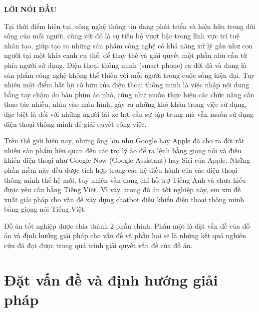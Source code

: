 \documentclass[12pt]{report}
\begin{document}
\newpage

\tableofcontents
\newpage

\listoffigures
{}
\newpage

\listoftables
{}

\newpage
\lstlistoflistings
{}

\newpage
\begin{center}
{\large \textbf{LỜI NÓI ĐẦU}}
\end{center}
Tại thời điểm hiện tại, công nghệ thông tin đang phát triển và hiện hữu trong đời sống của mỗi người, cùng với đó là sự tiến bộ vượt bậc trong lĩnh vực trí tuệ nhân tạo, giúp tạo ra những sản phẩm công nghệ có khả năng xử lý gần như con người tại một khía cạnh cụ thể, để thay thế và giải quyết một phần nhu cầu từ phía người sử dụng. Điện thoại thông minh (smart phone) ra đời đã và đang là sản phẩm công nghệ không thể thiếu với mỗi người trong cuộc sống hiện đại. Tuy nhiên một điểm bất lợi cố hữu của điện thoại thông minh là việc nhập nội dung bằng tay chậm do bàn phím ảo nhỏ, cũng như muốn thực hiện các chức năng cần thao tác nhiều, nhìn vào màn hình, gây ra những khó khăn trong việc sử dụng, đặc biệt là đối với những người lái xe hơi cần sự tập trung mà vẫn muốn sử dụng điện thoại thông minh để giải quyết công việc.

Trên thế giới hiện nay, những ông lớn như Google hay Apple đã cho ra đời rất nhiều sản phẩm liên quan đến các trợ lý ảo để ra lệnh bằng giọng nói và điều khiển điện thoại như Google Now (Google Assistant) hay Siri của Apple. Những phần mềm này đều được tích hợp trong các hệ điều hành của các điện thoại thông minh thế hệ mới, tuy nhiên vẫn đang chỉ hỗ trợ Tiếng Anh và chưa hiểu được yêu cầu bằng Tiếng Việt. Vì vậy, trong đồ án tốt nghiệp này, em xin đề xuất giải pháp cho vấn đề xây dựng chatbot điều khiển điện thoại thông minh bằng giọng nói Tiếng Việt.

Đồ án tốt nghiệp được chia thành 2 phần chính. Phẩn một là đặt vấn đề của đồ án và định hướng giải pháp cho vấn đề và phần hai sẽ là những kết quả nghiên cứu đã đạt được trong quá trình giải quyết vấn đề của đồ án.

\newpage
\setcounter{page}{1}

\newcommand{\alice}{A.L.I.C.E }

\part{Đặt vấn đề và định hướng giải pháp}
\end{document}
